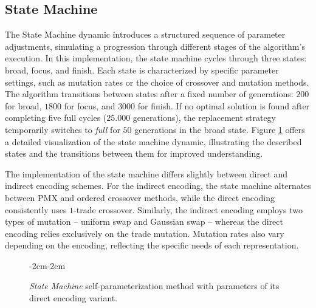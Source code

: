 \documentclass[english,examples]{isasthesis}
\begin{document}
\subsection{State Machine}
\label{StateMachine}
The State Machine dynamic introduces a structured sequence of parameter
adjustments, simulating a progression through different stages of the
algorithm's execution. In this implementation, the state machine cycles through
three states: broad, focus, and finish. Each state is characterized by specific
parameter settings, such as mutation rates or the choice of crossover and
mutation methods. The algorithm transitions between states after a fixed number
of generations: $200$ for broad, $1800$ for focus, and $3000$ for finish. If no
optimal solution is found after completing five full cycles
($25.000$ generations), the replacement strategy temporarily switches to
\textit{full} for $50$ generations in the broad state. 
Figure \ref{fig:state_machine} offers a detailed visualization of the state
machine dynamic, illustrating the described states and the transitions between
them for improved understanding.

The implementation of the state machine differs slightly between direct and
indirect encoding schemes. For the indirect encoding, the state machine
alternates between PMX and ordered crossover methods, while the direct encoding
consistently uses $1$-trade crossover. Similarly, the indirect encoding employs
two types of mutation -- uniform swap and Gaussian swap -- whereas the direct
encoding relies exclusively on the trade mutation. Mutation rates also vary
depending on the encoding, reflecting the specific needs of each representation.

\begin{figure}[h!]
    \begin{adjustwidth}{-2cm}{-2cm}
        \centering
        
        \caption{
            \textit{State Machine} self-parameterization method with parameters
            of its direct encoding variant.
        }
        \label{fig:state_machine}
    \end{adjustwidth}
\end{figure}
\end{document}
